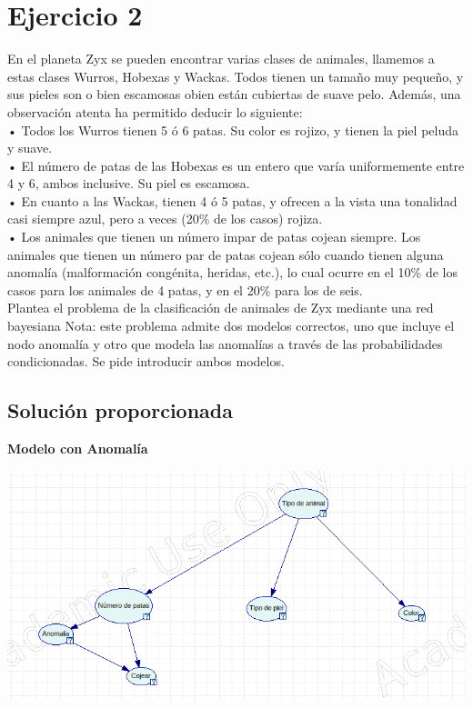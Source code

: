 \documentclass{article}
\begin{document}
\section{Ejercicio 2}

En el planeta Zyx se pueden encontrar varias clases de animales, llamemos a estas clases Wurros,
Hobexas y Wackas. Todos tienen un tamaño muy pequeño, y sus pieles son o bien escamosas obien están cubiertas de suave pelo. Además, una observación atenta ha permitido deducir lo
siguiente:\\
• Todos los Wurros tienen 5 ó 6 patas. Su color es rojizo, y tienen la piel peluda y suave.\\
• El número de patas de las Hobexas es un entero que varía uniformemente entre 4 y 6,
ambos inclusive. Su piel es escamosa.\\
• En cuanto a las Wackas, tienen 4 ó 5 patas, y ofrecen a la vista una tonalidad casi siempre
azul, pero a veces (20\% de los casos) rojiza.\\
• Los animales que tienen un número impar de patas cojean siempre. Los animales que
tienen un número par de patas cojean sólo cuando tienen alguna anomalía (malformación
congénita, heridas, etc.), lo cual ocurre en el 10\% de los casos para los animales de 4 patas, y en el 20\% para los de seis.\\
Plantea el problema de la clasificación de animales de Zyx mediante una red bayesiana
Nota: este problema admite dos modelos correctos, uno que incluye el nodo anomalía y otro que modela las anomalías a través de las probabilidades condicionadas. Se pide introducir ambos modelos.

\subsection{Solución proporcionada}

\textbf{Modelo con Anomalía}

\begin{center}
\includegraphics[scale=0.5]{Modelo2.png}
\end{center}
\end{document}
